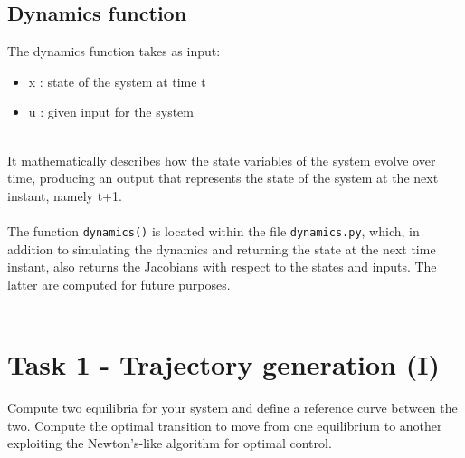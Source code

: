 \documentclass[a4paper,11pt,oneside]{book}
\begin{document}
\section{Dynamics function}
The dynamics function takes as input:
\begin{itemize}
    \item x : state of the system at time t
    \item u : given input for the system
\end{itemize}
\\It mathematically describes how the state variables of the system evolve over time, producing an output that represents the state of the system at the next instant, namely t+1.\\\\
The function \texttt{dynamics()} is located within the file \texttt{dynamics.py}, which, in addition to simulating the dynamics and returning the state at the next time instant, also returns the Jacobians with respect to the states and inputs. The latter are computed for future purposes.\\\\

\setcounter{section}{+1}
\chapter{Task 1 - Trajectory generation (I)}\label{chapter:task1}
Compute two equilibria for your system and define a reference curve between the two.
Compute the optimal transition to move from one equilibrium to another exploiting the Newton's-like algorithm for optimal control.
\end{document}
